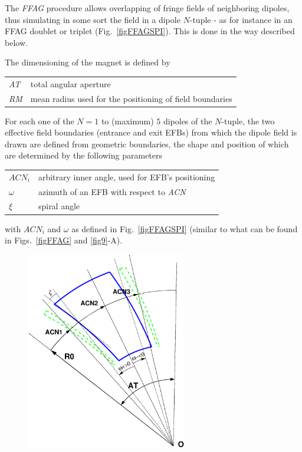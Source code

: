 \medskip

\noindent The \textsl{FFAG} procedure allows overlapping of fringe fields of neighboring dipoles, 
thus simulating in some sort the field in a dipole $N$-tuple - as for instance in an FFAG doublet 
or triplet (Fig.~\ref{figFFAGSPI}). This is done in the way described below. 

\medskip

\noindent  The dimensioning of the magnet is defined by

\medskip

 \begin{tabular}{>{\sl}l!{~:}l}
	 AT &  total angular aperture \\
	 RM & mean radius used for the positioning of field boundaries\\
 \end{tabular}

\medskip

\noindent For each one of the $N=1$ to (maximum) $5$ dipoles of the  $N$-tuple, 
the two  effective field boundaries (entrance and exit EFBs) from which  the dipole field  is drawn are
defined from geometric boundaries, the shape and position of which are determined by the 
following parameters 

\medskip

\begin{tabular}{l!{~:}l}
	$ACN_i$  & arbitrary inner angle, used for EFB's positioning  \\
	$\omega$ &  azimuth of an EFB with respect to  \textsl{ACN}\\
	$\xi$ & spiral angle \\
\end{tabular}

\medskip

\noindent with $ACN_i$ and $\omega$ as defined in Fig.~\ref{figFFAGSPI} 
(similar to what can be found in Figs.~\ref{figFFAG} and \ref{fig9}-A). 

\begin{figure}[h]
\centerline{\includegraphics[width=7cm]{figFFAGSPI.eps}  }
{\setlength{\captionwidth}{12cm}
 }
\end{figure}



